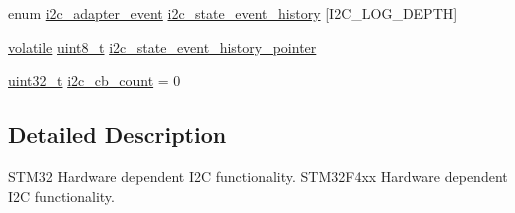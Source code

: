 \begin{DoxyCompactItemize}
\item 
enum \hyperlink{group___p_i_o_s___i2_c_ga2a8f77797f5dbd873514e92d3d043649}{i2c\-\_\-adapter\-\_\-event} \hyperlink{group___p_i_o_s___i2_c_gad2fddef6926d27512901cbe84b7b99bd}{i2c\-\_\-state\-\_\-event\-\_\-history} \mbox{[}I2\-C\-\_\-\-L\-O\-G\-\_\-\-D\-E\-P\-T\-H\mbox{]}
\item 
\hyperlink{group___c_m_s_i_s___core___instruction_interface_gad7d93af13046b0378601b85c8c16673b}{volatile} \hyperlink{stdint_8h_aba7bc1797add20fe3efdf37ced1182c5}{uint8\-\_\-t} \hyperlink{group___p_i_o_s___i2_c_gabdb9d9357371d1ece20779da0d69d27b}{i2c\-\_\-state\-\_\-event\-\_\-history\-\_\-pointer}
\item 
\hyperlink{stdint_8h_a435d1572bf3f880d55459d9805097f62}{uint32\-\_\-t} \hyperlink{group___p_i_o_s___i2_c_gadd232b764b6676824e5a173a7b78f9fd}{i2c\-\_\-cb\-\_\-count} = 0
\end{DoxyCompactItemize}


\subsection{Detailed Description}
S\-T\-M32 Hardware dependent I2\-C functionality. S\-T\-M32\-F4xx Hardware dependent I2\-C functionality.

